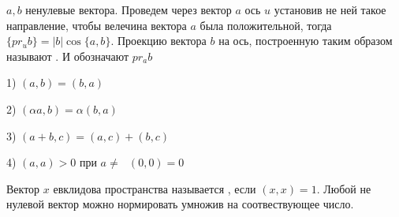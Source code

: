
\begin{defin}
  $a,b$ ненулевые вектора. Проведем через вектор $a$ ось $u$ установив не ней
  такое направление, чтобы велечина вектора $a$ была положительной, тогда
  $\{pr_u b\} = |b|\cos\{a,b\}$. Проекцию вектора $b$ на ось, построенную таким
  образом называют . И обозначают
  $pr_a b$

  1) $(a, b) = (b, a)$

  2) $(\alpha a, b) = \alpha(b,a)$

  3) $(a + b, c) = (a, c) + (b, c)$

  4) $(a, a) > 0$ при $a \not= ~~~ (0,0) = 0$
\end{defin}

\begin{defin}
  Вектор $x$ евклидова пространства называется , если
  $(x,x)=1$. Любой не нулевой вектор можно нормировать умножив на соотвествующее
  число.
\end{defin}